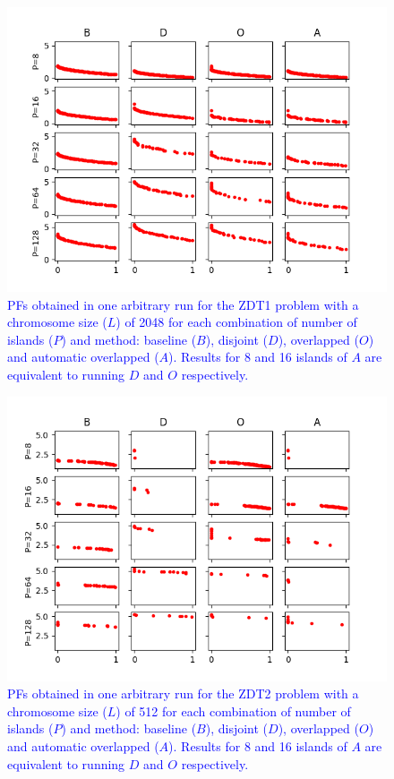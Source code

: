 \documentclass[preprint]{elsarticle}
\begin{document}
\begin{figure}
\centering
\includegraphics[width=12cm]{plot_zdt1_2048.png}
\caption{\textcolor{blue}{PFs obtained in one arbitrary run for the ZDT1 problem with a chromosome size ($L$) of 2048 for each combination of number of islands ($P$) and method: baseline ($B$), disjoint ($D$), overlapped ($O$) and automatic overlapped ($A$). Results for 8 and 16 islands of $A$ are equivalent to running $D$ and $O$ respectively. }}
\label{fig:plot_zdt1_2048}
\end{figure}






\begin{figure}
\centering
\includegraphics[width=12cm]{plot_zdt2_512.png}
\caption{\textcolor{blue}{PFs obtained in one arbitrary run for the ZDT2 problem with a chromosome size ($L$) of 512 for each combination of number of islands ($P$) and method: baseline ($B$), disjoint ($D$), overlapped ($O$) and automatic overlapped ($A$). Results for 8 and 16 islands of $A$ are equivalent to running $D$ and $O$ respectively. }}
\label{fig:plot_zdt2_512}
\end{figure}
\end{document}

